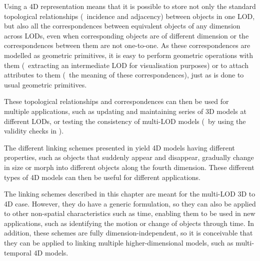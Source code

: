 Using a 4D representation means that it is possible to store not only the standard topological relationships (\eg\ incidence and adjacency) between objects in one LOD, but also all the correspondences between equivalent objects of any dimension across LODs, even when corresponding objects are of different dimension or the correspondences between them are not one-to-one.
As these correspondences are modelled as geometric primitives, it is easy to perform geometric operations with them (\eg\ extracting an intermediate LOD for visualisation purposes) or to attach attributes to them (\eg\ the meaning of these correspondences), just as is done to usual geometric primitives.

These topological relationships and correspondences can then be used for multiple applications, such as updating and maintaining series of 3D models at different LODs, or testing the consistency of multi-LOD models (\eg\ by using the validity checks in \citet{Groger11}).

The different linking schemes presented in  yield 4D models having different properties, such as objects that suddenly appear and disappear, gradually change in size or morph into different objects along the fourth dimension.
These different types of 4D models can then be useful for different applications.

The linking schemes described in this chapter are meant for the multi-LOD 3D to 4D case.
However, they do have a generic formulation, so they can also be applied to other non-spatial characteristics such as time, enabling them to be used in new applications, such as identifying the motion or change of objects through time.
In addition, these schemes are fully dimension-independent, so it is conceivable that they can be applied to linking multiple higher-dimensional models, such as multi-temporal 4D models.